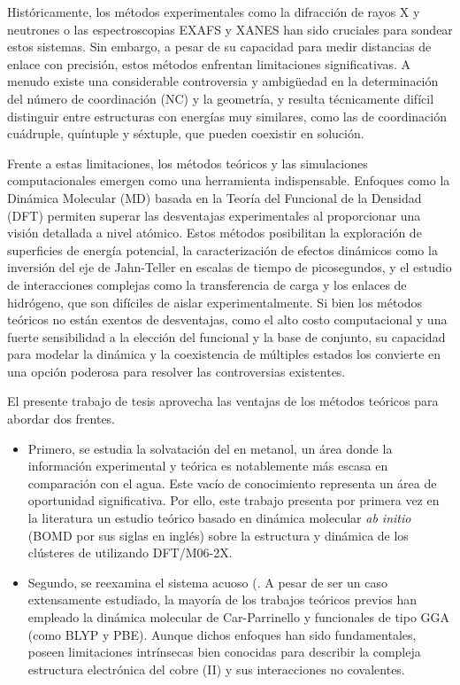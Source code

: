 Históricamente, los métodos experimentales como la difracción de rayos X y neutrones o las espectroscopias EXAFS y XANES han sido cruciales para sondear estos sistemas. Sin embargo, a pesar de su capacidad para medir distancias de enlace con precisión, estos métodos enfrentan limitaciones significativas. A menudo existe una considerable controversia y ambigüedad en la determinación del número de coordinación (NC) y la geometría, y resulta técnicamente difícil distinguir entre estructuras con energías muy similares, como las de coordinación cuádruple, quíntuple y séxtuple, que pueden coexistir en solución.

Frente a estas limitaciones, los métodos teóricos y las simulaciones computacionales emergen como una herramienta indispensable. Enfoques como la Dinámica Molecular (MD) basada en la Teoría del Funcional de la Densidad (DFT) permiten superar las desventajas experimentales al proporcionar una visión detallada a nivel atómico. Estos métodos posibilitan la exploración de superficies de energía potencial, la caracterización de efectos dinámicos como la inversión del eje de Jahn-Teller en escalas de tiempo de picosegundos, y el estudio de interacciones complejas como la transferencia de carga y los enlaces de hidrógeno, que son difíciles de aislar experimentalmente. Si bien los métodos teóricos no están exentos de desventajas, como el alto costo computacional y una fuerte sensibilidad a la elección del funcional y la base de conjunto, su capacidad para modelar la dinámica y la coexistencia de múltiples estados los convierte en una opción poderosa para resolver las controversias existentes.

El presente trabajo de tesis aprovecha las ventajas de los métodos teóricos para abordar dos frentes. 

\begin{itemize}
    \item Primero, se estudia la solvatación del  en metanol, un área donde la información experimental y teórica es notablemente más escasa en comparación con el agua. Este vacío de conocimiento representa un área de oportunidad significativa. Por ello, este trabajo presenta por primera vez en la literatura un estudio teórico  basado en dinámica molecular \textit{ab initio} (BOMD por sus siglas en inglés) sobre la estructura y dinámica de los clústeres de  utilizando DFT/M06-2X.
    \item  Segundo, se reexamina el sistema acuoso (. A pesar de ser un caso extensamente estudiado, la mayoría de los trabajos teóricos previos han empleado la dinámica molecular de Car-Parrinello y funcionales de tipo GGA (como BLYP y PBE). Aunque dichos enfoques han sido fundamentales, poseen limitaciones intrínsecas bien conocidas para describir la compleja estructura electrónica del cobre (II) y sus interacciones no covalentes.
\end{itemize}

